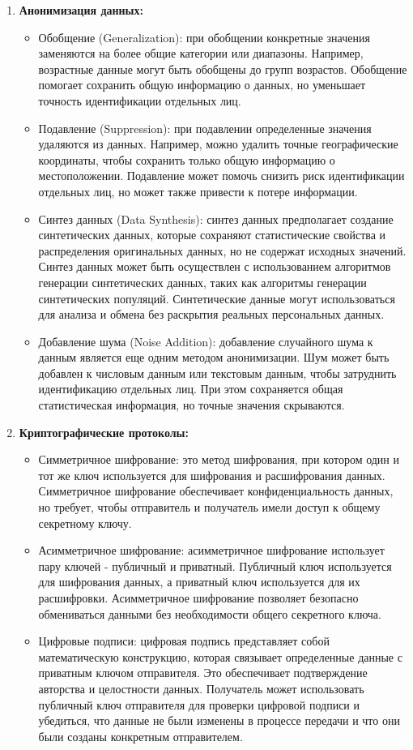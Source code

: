 \begin{enumerate}
    \item \textbf{Анонимизация данных:} \begin{itemize}
        \item Обобщение (Generalization): при обобщении конкретные значения заменяются на более общие категории или диапазоны. Например, возрастные данные могут быть обобщены до групп возрастов. Обобщение помогает сохранить общую информацию о данных, но уменьшает точность идентификации отдельных лиц.
        \item Подавление (Suppression): при подавлении определенные значения удаляются из данных. Например, можно удалить точные географические координаты, чтобы сохранить только общую информацию о местоположении. Подавление может помочь снизить риск идентификации отдельных лиц, но может также привести к потере информации.
        \item Синтез данных (Data Synthesis): синтез данных предполагает создание синтетических данных, которые сохраняют статистические свойства и распределения оригинальных данных, но не содержат исходных значений. Синтез данных может быть осуществлен с использованием алгоритмов генерации синтетических данных, таких как алгоритмы генерации синтетических популяций. Синтетические данные могут использоваться для анализа и обмена без раскрытия реальных персональных данных.
        \item Добавление шума (Noise Addition): добавление случайного шума к данным является еще одним методом анонимизации. Шум может быть добавлен к числовым данным или текстовым данным, чтобы затруднить идентификацию отдельных лиц. При этом сохраняется общая статистическая информация, но точные значения скрываются.
    \end{itemize}

    \item \textbf{Криптографические протоколы:} \begin{itemize}
        \item Симметричное шифрование: это метод шифрования, при котором один и тот же ключ используется для шифрования и расшифрования данных. Симметричное шифрование обеспечивает конфиденциальность данных, но требует, чтобы отправитель и получатель имели доступ к общему секретному ключу.
        \item Асимметричное шифрование: асимметричное шифрование использует пару ключей - публичный и приватный. Публичный ключ используется для шифрования данных, а приватный ключ используется для их расшифровки. Асимметричное шифрование позволяет безопасно обмениваться данными без необходимости общего секретного ключа.
        \item Цифровые подписи: цифровая подпись представляет собой математическую конструкцию, которая связывает определенные данные с приватным ключом отправителя. Это обеспечивает подтверждение авторства и целостности данных. Получатель может использовать публичный ключ отправителя для проверки цифровой подписи и убедиться, что данные не были изменены в процессе передачи и что они были созданы конкретным отправителем.
    \end{itemize}


\end{enumerate}

